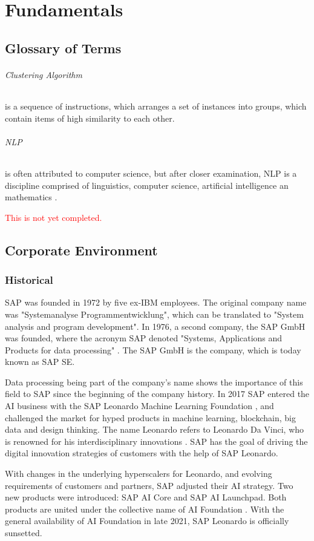 \chapter{Fundamentals}
\section{Glossary of Terms}

	\subparagraph{Clustering Algorithm} is a sequence of instructions, which arranges a set of instances into groups, which contain items of high similarity to each other.
	\subparagraph{\ac{NLP}}is often attributed to computer science, but after closer examination, \ac{NLP} is a discipline comprised of linguistics, computer science, artificial intelligence an mathematics \cite{chowdhury2003}.
	
	\textcolor{red}{This is not yet completed.}
	

\section{Corporate Environment}

	\subsection{Historical}
	SAP was founded in 1972 by five ex-IBM employees. The original company name was "Systemanalyse Programmentwicklung", which can be translated to "System analysis and program development". In 1976, a second company, the SAP GmbH was founded, where the acronym SAP denoted "Systems, Applications and Products for data processing" \cite{GeschichteSAP1972}. The SAP GmbH is the company, which is today known as SAP SE. 
	
	Data processing being part of the company's name shows the importance of this field to SAP since the beginning of the company history.
	In 2017 SAP entered the AI business with the SAP Leonardo Machine Learning Foundation \cite{rutschmannSAPLeonardo2021}, and challenged the market for hyped products in machine learning, blockchain, big data and design thinking. The name Leonardo refers to Leonardo Da Vinci, who is renowned for his interdisciplinary innovations \cite{schmitzLeonardo}. SAP has the goal of driving the digital innovation strategies of customers with the help of SAP Leonardo.
	
	
	With changes in the underlying hyperscalers for Leonardo, and evolving requirements of customers and partners, SAP adjusted their AI strategy. Two new products were introduced: SAP AI Core and SAP AI Launchpad. Both products are united under the collective name of AI Foundation \cite{rutschmannSAPLeonardo2021}. With the general availability of AI Foundation in late 2021, SAP Leonardo is officially sunsetted.

